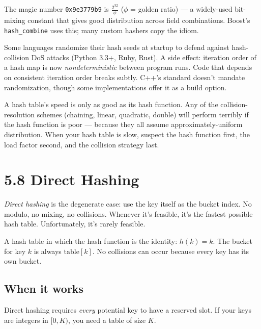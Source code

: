 \documentclass[11pt]{article}
\begin{document}
The magic number \texttt{0x9e3779b9} is $\frac{2^{32}}{\phi}$
($\phi$ = golden ratio) --- a widely-used bit-mixing constant
that gives good distribution across field combinations. Boost's
\texttt{hash\_combine} uses this; many custom hashers copy the
idiom.

\begin{notebox}
Some languages randomize their hash seeds at startup to defend
against hash-collision DoS attacks (Python 3.3+, Ruby, Rust). A
side effect: iteration order of a hash map is now
\emph{nondeterministic} between program runs. Code that depends
on consistent iteration order breaks subtly. C++'s standard
doesn't mandate randomization, though some implementations offer
it as a build option.
\end{notebox}

\begin{ideabox}
A hash table's speed is only as good as its hash function. Any
of the collision-resolution schemes (chaining, linear, quadratic,
double) will perform terribly if the hash function is poor ---
because they all assume approximately-uniform distribution. When
your hash table is slow, suspect the hash function first, the
load factor second, and the collision strategy last.
\end{ideabox}

\section{5.8 Direct Hashing}

\emph{Direct hashing} is the degenerate case: use the key itself
as the bucket index. No modulo, no mixing, no collisions.
Whenever it's feasible, it's the fastest possible hash table.
Unfortunately, it's rarely feasible.

\begin{defnbox}
A hash table in which the hash function is the identity:
$h(k) = k$. The bucket for key $k$ is always $\text{table}[k]$.
No collisions can occur because every key has its own bucket.
\end{defnbox}

\subsection*{When it works}

Direct hashing requires \emph{every} potential key to have a
reserved slot. If your keys are integers in $[0, K)$, you need a
table of size $K$.
\end{document}
